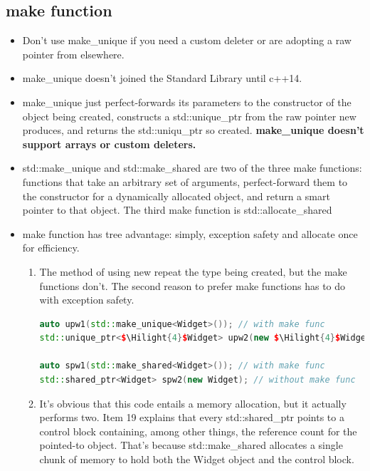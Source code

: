 \documentclass[a4paper,12pt,twoside]{book}
\newcommand{\Hilight}[1]{\makebox[0pt][l]{\color{yellow}\rule[-3pt]{#1em}{11pt}}}
\begin{document}
\subsection{make function}
\begin{itemize}

\item Don't use make\_unique if you need a custom deleter or are adopting a raw pointer from elsewhere.

\item make\_unique doesn't joined the Standard Library until c++14.

\item make\_unique just perfect-forwards its parameters to the constructor of the object being created, constructs a std::unique\_ptr from the raw pointer new produces, and returns the std::uniqu\_ptr so created. \textbf{make\_unique doesn't support arrays or custom deleters.}

\item std::make\_unique and std::make\_shared are two of the three make functions: functions that take an arbitrary set of arguments, perfect-forward them to the constructor for a dynamically allocated object, and return a smart pointer to that object. The third make function is std::allocate\_shared
\item make function has tree advantage: simply, exception safety and allocate once for efficiency.

\begin{enumerate}
\item The method of using new repeat the type being created, but the make functions don't.  The second reason to prefer make functions has to do with exception safety.
\begin{lstlisting}[frame=single, language=c++, mathescape=true]
auto upw1(std::make_unique<Widget>()); // with make func
std::unique_ptr<$\Hilight{4}$Widget> upw2(new $\Hilight{4}$Widget); // without make func

auto spw1(std::make_shared<Widget>()); // with make func
std::shared_ptr<Widget> spw2(new Widget); // without make func
\end{lstlisting}

\item It's obvious that this code entails a memory allocation, but it actually performs two. Item 19 explains that every std::shared\_ptr points to a control block containing, among other things, the reference count for the pointed-to object. That's because std::make\_shared allocates a single chunk of
memory to hold both the Widget object and the control block.
\end{enumerate}


\end{itemize}
\end{document}
